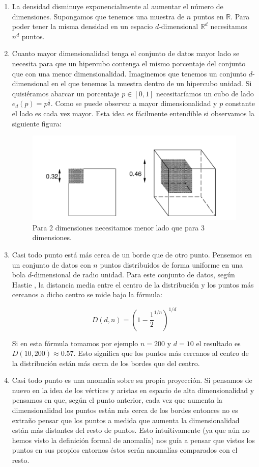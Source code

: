 \begin{enumerate}
	\item La densidad disminuye exponencialmente al aumentar el número de dimensiones. Supongamos que tenemos una muestra de $n$ puntos en $\mathbb{R}$. Para poder tener la misma densidad en un espacio $d$-dimensional $\mathbb{R}^d$ necesitamos $n^d$ puntos.
	\item Cuanto mayor dimensionalidad tenga el conjunto de datos mayor lado se necesita para que un hipercubo contenga el mismo porcentaje del conjunto que con una menor dimensionalidad. Imaginemos que tenemos un conjunto $d$-dimensional en el que tenemos la muestra dentro de un hipercubo unidad. Si quisiéramos abarcar un porcentaje $p\in [0,1]$ necesitaríamos un cubo de lado $e_d (p) = p^{\frac{1}{d}}$. Como se puede observar a mayor dimensionalidad y $p$ constante el lado es cada vez mayor. Esta idea es fácilmente entendible si observamos la siguiente figura:
	
	\begin{figure}[H]
		\centering
		\label{radio_alta_dimensionalidad}
		\includegraphics[scale=0.6]{imagenes/radio_alta_dimensionalidad}
		\caption{Para 2 dimensiones necesitamos menor lado que para 3 dimensiones. \cite[p.~64]{cherkassky_learning_2007}}
	\end{figure}
	\item Casi todo punto está más cerca de un borde que de otro punto. Pensemos en un conjunto de datos con $n$ puntos distribuidos de forma uniforme en una bola $d$-dimensional de radio unidad. Para este conjunto de datos, según Hastie \cite{hastie_t._elements_nodate}, la distancia media entre el centro de la distribución y los puntos más cercanos a dicho centro se mide bajo la fórmula:
	
	$$D(d,n) = (1-\frac{1}{2}^{1/n})^{1/d}$$
	
	Si en esta fórmula tomamos por ejemplo $n=200$ y $d=10$ el resultado es $D(10,200) \approx 0.57$. Esto significa que los puntos más cercanos al centro de la distribución están más cerca de los bordes que del centro.
	\item Casi todo punto es una anomalía sobre su propia proyección. Si pensamos de nuevo en la idea de los vértices y aristas en espacio de alta dimensionalidad y pensamos en que, según el punto anterior, cada vez que aumenta la dimensionalidad los puntos están más cerca de los bordes entonces no es extraño pensar que los puntos a medida que aumenta la dimensionalidad están más distantes del resto de puntos. Esto intuitivamente (ya que aún no hemos visto la definición formal de anomalía) nos guía a pensar que vistos los puntos en sus propios entornos éstos serán anomalías comparados con el resto.
	

\end{enumerate}
